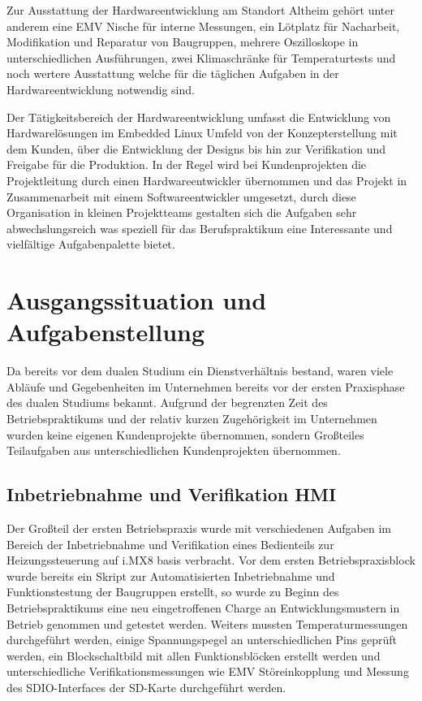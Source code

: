 \documentclass[praktikum,german]{hgbthesis}
\begin{document}
Zur Ausstattung der Hardwareentwicklung am Standort Altheim gehört unter anderem eine EMV Nische für interne Messungen, ein Lötplatz für Nacharbeit, Modifikation und Reparatur von Baugruppen, mehrere Oszilloskope in unterschiedlichen Ausführungen, zwei Klimaschränke für Temperaturtests und noch wertere Ausstattung welche für die täglichen Aufgaben in der Hardwareentwicklung notwendig sind.

Der Tätigkeitsbereich der Hardwareentwicklung umfasst die Entwicklung von Hardwarelösungen im Embedded Linux Umfeld von der Konzepterstellung mit dem Kunden, über die Entwicklung der Designs bis hin zur Verifikation und Freigabe für die Produktion. In der Regel wird bei Kundenprojekten die Projektleitung durch einen Hardwareentwickler übernommen und das Projekt in Zusammenarbeit mit einem Softwareentwickler umgesetzt, durch diese Organisation in kleinen Projektteams gestalten sich die Aufgaben sehr abwechslungsreich was speziell für das Berufspraktikum eine Interessante und vielfältige Aufgabenpalette bietet.

\chapter{Ausgangssituation und Aufgabenstellung}
%

Da bereits vor dem dualen Studium ein Dienstverhältnis bestand, waren viele Abläufe und Gegebenheiten im Unternehmen bereits vor der ersten Praxisphase des dualen Studiums bekannt. Aufgrund der begrenzten Zeit des Betriebspraktikums und der relativ kurzen Zugehörigkeit im Unternehmen wurden keine eigenen Kundenprojekte übernommen, sondern Großteiles Teilaufgaben aus unterschiedlichen Kundenprojekten übernommen. 

\section{Inbetriebnahme und Verifikation HMI}
Der Großteil der ersten Betriebspraxis wurde mit verschiedenen Aufgaben im Bereich der Inbetriebnahme und Verifikation eines Bedienteils zur Heizungssteuerung auf i.MX8 basis verbracht. Vor dem ersten Betriebspraxisblock wurde bereits ein Skript zur Automatisierten Inbetriebnahme und Funktionstestung der Baugruppen erstellt, so wurde zu Beginn des Betriebspraktikums eine neu eingetroffenen Charge an Entwicklungsmustern in Betrieb genommen und getestet werden. Weiters mussten Temperaturmessungen durchgeführt werden, einige Spannungspegel an unterschiedlichen Pins geprüft werden, ein Blockschaltbild mit allen Funktionsblöcken erstellt werden und unterschiedliche Verifikationsmessungen wie EMV Störeinkopplung und Messung des SDIO-Interfaces der SD-Karte durchgeführt werden.
\end{document}
